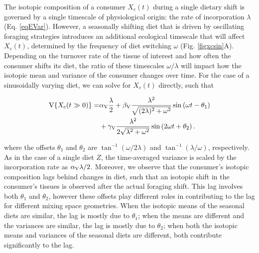 \documentclass{article}
\begin{document}
The isotopic composition of a consumer $X_c(t)$ during a single dietary shift is governed by a single timescale of physiological origin: the rate of incorporation $\lambda$ (Eq. \ref{eqEVar}).
However, a seasonally shifting diet that is driven by oscillating foraging strategies introduces an additional ecological timescale that will affect $X_c(t)$, determined by the frequency of diet switching $\omega$ (Fig. \ref{figxcsin}A).
Depending on the turnover rate of the tissue of interest and how often the consumer shifts its diet, the ratio of these timescales $\omega/\lambda$ will impact how the isotopic mean and variance of the consumer changes over time.
For the case of a sinusoidally varying diet, we can solve for $X_c(t)$ directly, such that

\begin{align}
  \label{eqXsin}
  \begin{split}
    {\rm V}\{X_c(t \gg 0)\} = &\alpha_{\rm V}\frac{\lambda}{2} + \beta_{\rm V}\frac{\lambda^2}{\sqrt{(2\lambda)^2 + \omega^2}}\sin\left(\omega t -\theta_1\right) \\
    &+ \gamma_{\rm V}\frac{\lambda^2}{2\sqrt{\lambda^2 + \omega^2}}\sin\left(2\omega t + \theta_2\right).
  \end{split}
\end{align}

\noindent where the offsets $\theta_1$ and $\theta_2$ are $ \tan^{-1}(\omega/2\lambda)$ and $ \tan^{-1}(\lambda/\omega)$, respectively.
As in the case of a single diet $Z$, the time-averaged variance is scaled by the incorporation rate as $\alpha_{\rm V}\lambda/2$.
Moreover, we observe that the consumer's isotopic composition lags behind changes in diet, such that an isotopic shift in the consumer's tissues is observed after the actual foraging shift.
This lag involves both $\theta_1$ and $\theta_2$, however these offsets play different roles in contributing to the lag for different mixing space geometries.
When the isotopic means of the seasonal diets are similar, the lag is mostly due to $\theta_1$; when the means are different and the variances are similar, the lag is mostly due to $\theta_2$; when both the isotopic means and variances of the seasonal diets are different, both contribute significantly to the lag.
\end{document}
